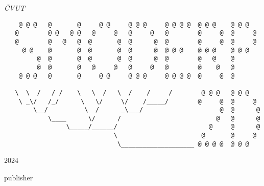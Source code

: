 \begin{titlepage}
	\vspace{0.5\baselineskip} %
	
	\textit{ČVUT} %
	
	\vfill %
	
	
	
	
	\begin{verbatim}
    @ @ @   @       @     @ @     @ @ @     @ @ @ @  @ @ @    @ @ @
   @        @ @   @ @   @     @   @     @   @        @     @  @     @
   @        @   @   @  @       @  @      @  @        @     @  @     @
     @ @    @       @  @       @  @      @  @ @ @    @ @ @    @ @ @
         @  @       @  @       @  @      @  @        @   @    @
         @  @       @   @     @   @     @   @        @    @   @
    @ @ @   @       @     @ @     @ @ @     @ @ @ @  @     @  @

   \  \  /   / /    \   \  /   \  /    /     /        @ @ @   @ @ @
    \ _\/   /_/      \   \/     \/    /_____/        @     @  @     @
        \__/          \  /      _\___/                     @  @      @
            \____      \/      /                          @   @      @
                 \_____/______/                         @     @      @
                              \                       @       @     @
                               \____________________ @ @ @ @  @ @ @
 \end{verbatim}
 
 
 
        
	
	\vspace{0.3\baselineskip} %
	
	2024 %
	
	{\large publisher} %

\end{titlepage}



